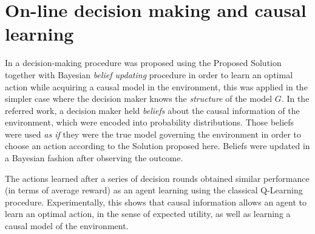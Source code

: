 \documentclass[letterpaper]{article} %
\begin{document}
\section{On-line decision making and causal learning}
In \cite{gonzalez2018playing} a decision-making procedure was proposed using the Proposed Solution together with Bayesian \textit{belief updating} procedure in order to learn an optimal action while acquiring a causal model in the environment, this was applied in the simpler case where the decision maker knows the \textit{structure} of the model $\textit{G}$. In the referred work, a decision maker held \textit{beliefs} about the causal information of the environment, which were encoded into probability distributions. Those beliefs were used \textit{as if} they were the true model governing the environment in order to choose an action according to the Solution proposed here. Beliefs were updated in a Bayesian fashion after observing the outcome. 

The actions learned after a series of decision rounds obtained similar performance (in terms of average reward) as an agent learning using the classical Q-Learning procedure. Experimentally, this shows that causal information allows an agent to learn an optimal action, in the sense of expected utility, as well as learning a causal model of the environment.


\end{document}

